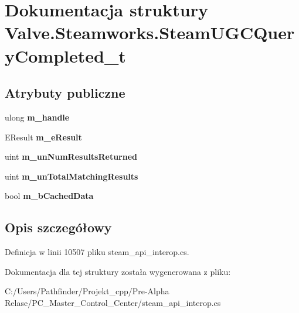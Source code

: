 \hypertarget{struct_valve_1_1_steamworks_1_1_steam_u_g_c_query_completed__t}{}\section{Dokumentacja struktury Valve.\+Steamworks.\+Steam\+U\+G\+C\+Query\+Completed\+\_\+t}
\label{struct_valve_1_1_steamworks_1_1_steam_u_g_c_query_completed__t}
\subsection*{Atrybuty publiczne}
\begin{DoxyCompactItemize}
\item 
\mbox{\label{struct_valve_1_1_steamworks_1_1_steam_u_g_c_query_completed__t_ab6d2520ebc2601dee573980c75b00ee7}} 
ulong {\bfseries m\+\_\+handle}
\item 
\mbox{\label{struct_valve_1_1_steamworks_1_1_steam_u_g_c_query_completed__t_ac1567df6c9e73a7e687466d68de90718}} 
E\+Result {\bfseries m\+\_\+e\+Result}
\item 
\mbox{\label{struct_valve_1_1_steamworks_1_1_steam_u_g_c_query_completed__t_a9762860ed6abe0d6fb47aa5ac49d06fd}} 
uint {\bfseries m\+\_\+un\+Num\+Results\+Returned}
\item 
\mbox{\label{struct_valve_1_1_steamworks_1_1_steam_u_g_c_query_completed__t_aab1f6ede0778d1a8735e4de2a73eb27c}} 
uint {\bfseries m\+\_\+un\+Total\+Matching\+Results}
\item 
\mbox{\label{struct_valve_1_1_steamworks_1_1_steam_u_g_c_query_completed__t_a35926ae487b7dc5ca7ad2ab974e7c297}} 
bool {\bfseries m\+\_\+b\+Cached\+Data}
\end{DoxyCompactItemize}


\subsection{Opis szczegółowy}


Definicja w linii 10507 pliku steam\+\_\+api\+\_\+interop.\+cs.



Dokumentacja dla tej struktury została wygenerowana z pliku\+:\begin{DoxyCompactItemize}
\item 
C\+:/\+Users/\+Pathfinder/\+Projekt\+\_\+cpp/\+Pre-\/\+Alpha Relase/\+P\+C\+\_\+\+Master\+\_\+\+Control\+\_\+\+Center/steam\+\_\+api\+\_\+interop.\+cs\end{DoxyCompactItemize}
